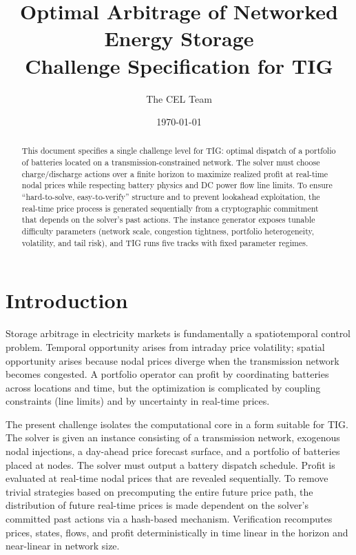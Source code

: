 \documentclass[11pt]{article}
\title{\textbf{Optimal Arbitrage of Networked Energy Storage}\\[0.35em]
\large{Challenge Specification for TIG}}
\author{The CEL Team}
\date{\today}
\begin{document}
\maketitle

\begin{abstract}
This document specifies a single challenge level for TIG: optimal dispatch of a portfolio of batteries located on a transmission-constrained network. The solver must choose charge/discharge actions over a finite horizon to maximize realized profit at real-time nodal prices while respecting battery physics and DC power flow line limits. To ensure ``hard-to-solve, easy-to-verify'' structure and to prevent lookahead exploitation, the real-time price process is generated sequentially from a cryptographic commitment that depends on the solver's past actions. The instance generator exposes tunable difficulty parameters (network scale, congestion tightness, portfolio heterogeneity, volatility, and tail risk), and TIG runs five tracks with fixed parameter regimes.
\end{abstract}

\section{Introduction}
Storage arbitrage in electricity markets is fundamentally a spatiotemporal control problem. Temporal opportunity arises from intraday price volatility; spatial opportunity arises because nodal prices diverge when the transmission network becomes congested. A portfolio operator can profit by coordinating batteries across locations and time, but the optimization is complicated by coupling constraints (line limits) and by uncertainty in real-time prices.

The present challenge isolates the computational core in a form suitable for TIG. The solver is given an instance consisting of a transmission network, exogenous nodal injections, a day-ahead price forecast surface, and a portfolio of batteries placed at nodes. The solver must output a battery dispatch schedule. Profit is evaluated at real-time nodal prices that are revealed sequentially. To remove trivial strategies based on precomputing the entire future price path, the distribution of future real-time prices is made dependent on the solver's committed past actions via a hash-based mechanism. Verification recomputes prices, states, flows, and profit deterministically in time linear in the horizon and near-linear in network size.
\end{document}
